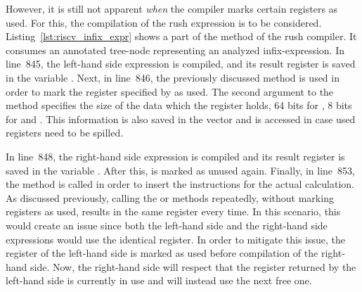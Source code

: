 
However, it is still not apparent \emph{when} the compiler marks certain registers as used.
For this, the compilation of the rush expression  is to be considered.
Listing~\ref{lst:riscv_infix_expr} shows a part of the  method of the rush compiler.
It consumes an annotated tree-node representing an analyzed infix-expression.
In line~845, the left-hand side expression is compiled, and its result register is saved in the variable .
Next, in line~846, the previously discussed  method is used in order to mark the register specified by  as used.
The second argument to the method specifies the size of the data which the register holds, 64 bits for , 8 bits for  and .
This information is also saved in the  vector and is accessed in case used registers need to be spilled.

In line~848, the right-hand side expression is compiled and its result register is saved in the variable .
After this,  is marked as unused again.
Finally, in line~853, the  method is called in order to insert the instructions for the actual calculation.
As discussed previously, calling the  or  methods
repeatedly, without marking registers as used, results in the same register every time.
In this scenario, this would create an issue since both the left-hand side and the right-hand side expressions would use the identical register.
In order to mitigate this issue, the register of the left-hand side is marked as used before compilation of the right-hand side.
Now, the right-hand side will respect that the register returned by the left-hand side is currently in use and will instead use the next free one.


